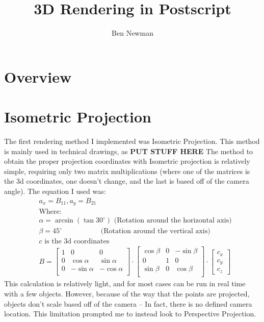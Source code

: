 \documentclass[12pt]{article}
\title{3D Rendering in Postscript}
\author{Ben Newman}
\begin{document}
	\maketitle
	\newpage
	\tableofcontents
	\newpage
	\section{Overview}
	

	\section{Isometric Projection}
	The first rendering method I implemented was Isometric Projection. This method is mainly used in technical drawings, as \textbf{PUT STUFF HERE}
	The method to obtain the proper projection coordinates with Isometric projection is relatively simple, requiring only two matrix multiplications (where one of the matrices is the 3d coordinates, one doesn't change, and the last is based off of the camera angle). The equation I used was: 
	\begin{align}
		&a_x=B_{11},a_y=B_{21}\\
		&\text{Where: }\\&\alpha=\arcsin{\left(\tan{30^\circ}\right)}\text{ (Rotation around the horizontal axis)}\\
		&\beta=45^\circ\hspace{61pt}\text{ (Rotation around the vertical axis)}\\
		&c \text{ is the 3d coordinates}\\
		&B=\left[ {\begin{array}{ccc}
				1 & 0 & 0 \\
				0 & \cos\alpha & \sin\alpha \\
				0 & -\sin\alpha & -\cos\alpha \\
		\end{array} } \right]
		\cdot 
		\left[ {\begin{array}{ccc}
				\cos\beta & 0 & -\sin\beta \\
				0 & 1 & 0 \\
				\sin\beta & 0 & \cos\beta \\
		\end{array} } \right]
		\cdot
		\left[ {\begin{array}{c}
			c_x \\ c_y \\c_z
		\end{array} } \right]
	\end{align}
	This calculation is relatively light, and for most cases can be run in real time with a few objects. However, because of the way that the points are projected, objects don't scale based off of the camera -- In fact, there is no defined camera location. This limitation prompted me to instead look to Perspective Projection.
\end{document}
